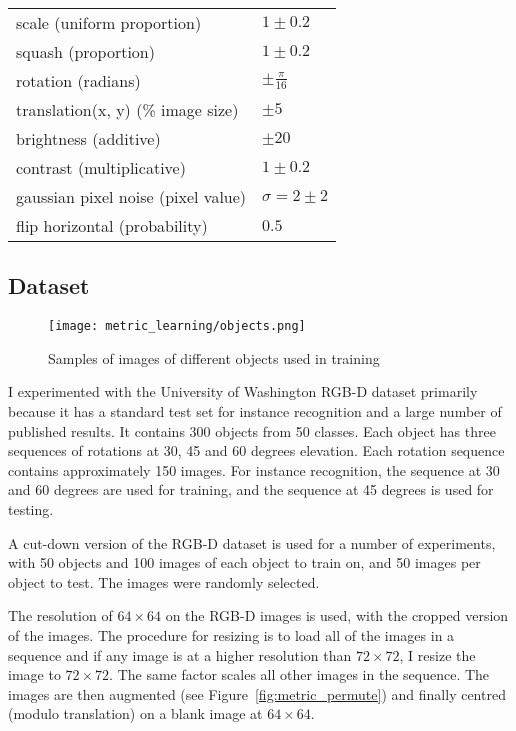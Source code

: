 \begin{table*}
  \centering
    \caption{Ranges of parameters used for image augmentation }

  \begin{tabular}{ l  l }
    \toprule
    scale (uniform proportion) & $ 1 \pm 0.2 $  \\ 
    squash (proportion)  & $ 1 \pm 0.2 $  \\ 
    rotation (radians) & $ \pm \frac{\pi}{16} $ \\ 
    translation(x, y) (\% image size) & $ \pm 5 $ \\ 
    brightness (additive) & $ \pm 20  $ \\ 
    contrast (multiplicative) & $ 1 \pm 0.2 $ \\ 
    gaussian pixel noise (pixel value) & $ \sigma = 2 \pm 2 $  \\ 
    flip horizontal (probability) & $ 0.5 $ \\ 
    \bottomrule
  \end{tabular}
\label{fig:metric_permute}
\end{table*}

\subsection {Dataset}

\begin{figure}[h]
\centering
\texttt{[image: metric\_learning/objects.png]}
\caption{Samples of images of different objects used in training}
\label{fig:metric_dataset}
\end{figure}

I experimented with the University of Washington RGB-D dataset primarily because it has a standard test set for instance recognition and a large number of published results. It contains 300 objects from 50 classes. Each object has three sequences of rotations at 30, 45 and 60 degrees elevation. Each rotation sequence contains approximately 150 images. For instance recognition, the sequence at 30 and 60 degrees are used for training, and the sequence at 45 degrees is used for testing. 

A cut-down version of the RGB-D dataset is used for a number of experiments, with 50 objects and 100 images of each object to train on, and 50 images per object to test. The images were randomly selected.

The resolution of $ 64\times64 $ on the RGB-D images is used, with the cropped version of the images. The procedure for resizing is to load all of the images in a sequence and if any image is at a higher resolution than $ 72\times72$, I resize the image to $ 72\times72 $. The same factor scales all other images in the sequence. The images are then augmented (see Figure~\ref{fig:metric_permute}) and finally centred (modulo translation) on a blank image at  $ 64\times64 $.


